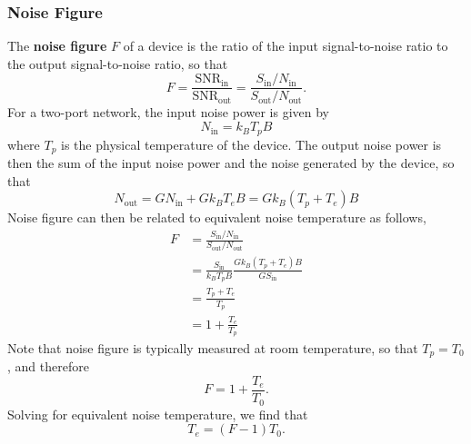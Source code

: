 \documentclass{article}
\begin{document}
\subsubsection{Noise Figure}
The \textbf{noise figure} \(F\) of a device is the ratio of the input
signal-to-noise ratio to the output signal-to-noise ratio, so that
\begin{equation*}
    F = \frac{\mathrm{SNR}_\mathrm{in}}{\mathrm{SNR}_\mathrm{out}} = \frac{S_\mathrm{in} / N_\mathrm{in}}{S_\mathrm{out} / N_\mathrm{out}}.
\end{equation*}
For a two-port network, the input noise power is given by
\begin{equation*}
    N_\mathrm{in} = k_B T_p B
\end{equation*}
where \(T_p\) is the physical temperature of the device. The output
noise power is then the sum of the input noise power and the noise
generated by the device, so that
\begin{equation*}
    N_\mathrm{out} = G N_\mathrm{in} + G k_B T_e B = G k_B \left( T_p + T_e \right) B
\end{equation*}
Noise figure can then be related to equivalent noise temperature as follows,
\begin{align*}
    F & = \frac{S_\mathrm{in} / N_\mathrm{in}}{S_\mathrm{out} / N_\mathrm{out}}                    \\
      & = \frac{S_\mathrm{in}}{k_B T_p B} \frac{G k_B \left( T_p + T_e \right) B}{G S_\mathrm{in}} \\
      & = \frac{T_p + T_e}{T_p}                                                                    \\
      & = 1 + \frac{T_e}{T_p}
\end{align*}
Note that noise figure is typically measured at room temperature, so
that \(T_p = T_0\), and therefore
\begin{equation*}
    F = 1 + \frac{T_e}{T_0}.
\end{equation*}
Solving for equivalent noise temperature, we find that
\begin{equation*}
    T_e = \left( F - 1 \right) T_0.
\end{equation*}
\end{document}
